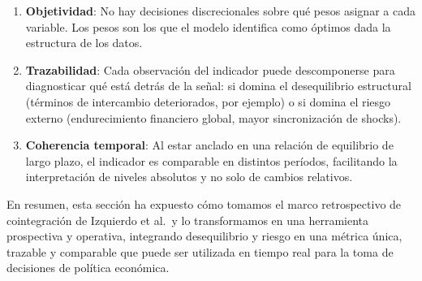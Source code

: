 \documentclass[11pt,a4paper]{article}
\numberwithin{equation}{section}
\begin{document}
\begin{enumerate}[nosep]
  \item \textbf{Objetividad}: No hay decisiones discrecionales sobre qué pesos asignar a cada variable. Los pesos son los que el modelo identifica como óptimos dada la estructura de los datos.
  \item \textbf{Trazabilidad}: Cada observación del indicador puede descomponerse para diagnosticar qué está detrás de la señal: si domina el desequilibrio estructural (términos de intercambio deteriorados, por ejemplo) o si domina el riesgo externo (endurecimiento financiero global, mayor sincronización de shocks).
  \item \textbf{Coherencia temporal}: Al estar anclado en una relación de equilibrio de largo plazo, el indicador es comparable en distintos períodos, facilitando la interpretación de niveles absolutos y no solo de cambios relativos.
\end{enumerate}

En resumen, esta sección ha expuesto cómo tomamos el marco retrospectivo de cointegración de Izquierdo et al.\ y lo transformamos en una herramienta prospectiva y operativa, integrando desequilibrio y riesgo en una métrica única, trazable y comparable que puede ser utilizada en tiempo real para la toma de decisiones de política económica.
\end{document}
